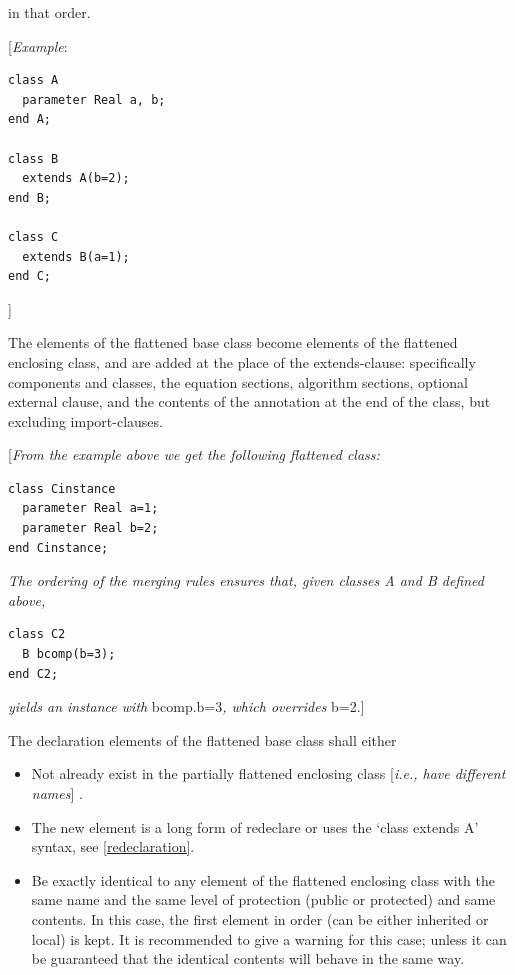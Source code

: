 \documentclass[10pt,a4paper]{report}
\begin{document}
in that order.

{[}\emph{Example}:
\begin{lstlisting}[language=modelica]
class A
  parameter Real a, b;
end A;

class B
  extends A(b=2);
end B;

class C
  extends B(a=1);
end C;
\end{lstlisting}
{]}

The elements of the flattened base class become elements of the
flattened enclosing class, and are added at the place of the
extends-clause: specifically components and classes, the equation
sections, algorithm sections, optional external clause, and the contents
of the annotation at the end of the class, but excluding import-clauses.

{[}\emph{From the example above we get the following flattened class:}
\begin{lstlisting}[language=modelica]
class Cinstance
  parameter Real a=1;
  parameter Real b=2;
end Cinstance;
\end{lstlisting}

\emph{The ordering of the merging rules ensures that, given classes A
and B defined above, }
\begin{lstlisting}[language=modelica]
class C2
  B bcomp(b=3);
end C2;
\end{lstlisting}

\emph{yields an instance with} bcomp.b=3\emph{, which overrides} b=2.{]}

The declaration elements of the flattened base class shall either

\begin{itemize}
\item
  Not already exist in the partially flattened enclosing class
  {[}\emph{i.e., have different names}{]} .
\end{itemize}

\begin{itemize}
\item
  The new element is a long form of redeclare or uses the `class extends
  A' syntax, see \ref{redeclaration}.
\item
  Be exactly identical to any element of the flattened enclosing class
  with the same name and the same level of protection (public or
  protected) and same contents. In this case, the first element in order
  (can be either inherited or local) is kept. It is recommended to give
  a warning for this case; unless it can be guaranteed that the
  identical contents will behave in the same way.
\end{itemize}
\end{document}
